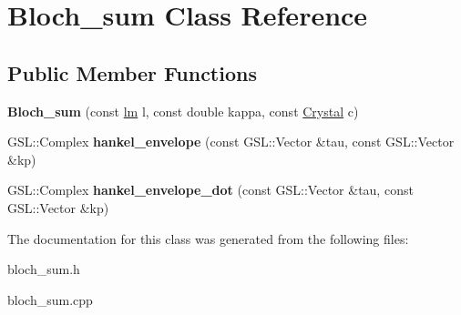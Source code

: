 \hypertarget{classBloch__sum}{}\section{Bloch\+\_\+sum Class Reference}
\label{classBloch__sum}
\subsection*{Public Member Functions}
\begin{DoxyCompactItemize}
\item 
\mbox{\label{classBloch__sum_ad0b17c6c7ab656afa9ad65083ef479d1}} 
{\bfseries Bloch\+\_\+sum} (const \hyperlink{structlm}{lm} l, const double kappa, const \hyperlink{classCrystal}{Crystal} c)
\item 
\mbox{\label{classBloch__sum_aed260ebecdae29d493ed57cb387a3cdf}} 
G\+S\+L\+::\+Complex {\bfseries hankel\+\_\+envelope} (const G\+S\+L\+::\+Vector \&tau, const G\+S\+L\+::\+Vector \&kp)
\item 
\mbox{\label{classBloch__sum_a5a1979ae3a3adefe783068b965f45774}} 
G\+S\+L\+::\+Complex {\bfseries hankel\+\_\+envelope\+\_\+dot} (const G\+S\+L\+::\+Vector \&tau, const G\+S\+L\+::\+Vector \&kp)
\end{DoxyCompactItemize}


The documentation for this class was generated from the following files\+:\begin{DoxyCompactItemize}
\item 
bloch\+\_\+sum.\+h\item 
bloch\+\_\+sum.\+cpp\end{DoxyCompactItemize}
